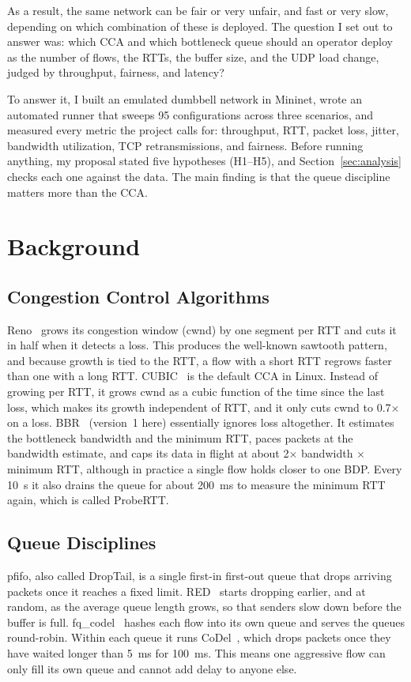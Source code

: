 \documentclass[conference,12pt,letterpaper]{IEEEtran}
\newcommand{\x}{\ensuremath{\times}}
\begin{document}
As a result, the same network can be fair or very unfair, and fast or very slow, depending on which combination of these is deployed. The question I set out to answer was: which CCA and which bottleneck queue should an operator deploy as the number of flows, the RTTs, the buffer size, and the UDP load change, judged by throughput, fairness, and latency?

To answer it, I built an emulated dumbbell network in Mininet, wrote an automated runner that sweeps 95 configurations across three scenarios, and measured every metric the project calls for: throughput, RTT, packet loss, jitter, bandwidth utilization, TCP retransmissions, and fairness. Before running anything, my proposal stated five hypotheses (H1--H5), and Section~\ref{sec:analysis} checks each one against the data. The main finding is that the queue discipline matters more than the CCA.

\section{Background}

\subsection{Congestion Control Algorithms}
Reno~\cite{jacobson,rfc5681} grows its congestion window (cwnd) by one segment per RTT and cuts it in half when it detects a loss. This produces the well-known sawtooth pattern, and because growth is tied to the RTT, a flow with a short RTT regrows faster than one with a long RTT. CUBIC~\cite{cubic} is the default CCA in Linux. Instead of growing per RTT, it grows cwnd as a cubic function of the time since the last loss, which makes its growth independent of RTT, and it only cuts cwnd to 0.7\x{} on a loss. BBR~\cite{bbr} (version~1 here) essentially ignores loss altogether. It estimates the bottleneck bandwidth and the minimum RTT, paces packets at the bandwidth estimate, and caps its data in flight at about 2\x{} bandwidth \x{} minimum RTT, although in practice a single flow holds closer to one BDP. Every 10~s it also drains the queue for about 200~ms to measure the minimum RTT again, which is called ProbeRTT.

\subsection{Queue Disciplines}
pfifo, also called DropTail, is a single first-in first-out queue that drops arriving packets once it reaches a fixed limit. RED~\cite{red} starts dropping earlier, and at random, as the average queue length grows, so that senders slow down before the buffer is full. fq\_codel~\cite{rfc8290} hashes each flow into its own queue and serves the queues round-robin. Within each queue it runs CoDel~\cite{codel}, which drops packets once they have waited longer than 5~ms for 100~ms. This means one aggressive flow can only fill its own queue and cannot add delay to anyone else.
\end{document}

